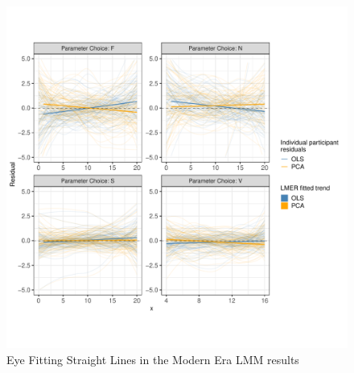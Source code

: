 \documentclass[print]{nuthesis}
\begin{document}
\begin{figure}
\includegraphics[width=1\linewidth]{thesis_files/figure-latex/eyefitting-lmer-residualplots-1} \caption{Eye Fitting Straight Lines in the Modern Era LMM results}\label{fig:eyefitting-lmer-residualplots}
\end{figure}
\end{document}
